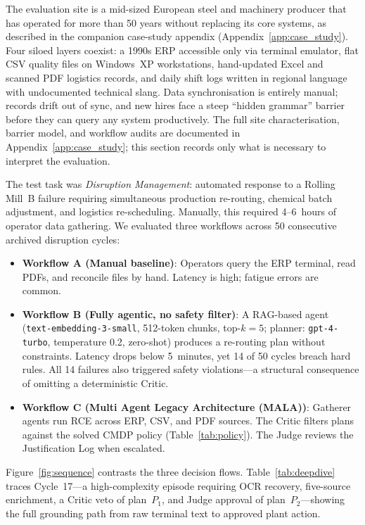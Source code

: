 \documentclass[conference]{IEEEtran}
\newcommand{\MALA}{Multi Agent Legacy Architecture (MALA)}
\begin{document}
The evaluation site is a mid-sized European steel and machinery producer that has operated for more than 50 years without replacing its core systems, as described in the companion case-study appendix (Appendix~\ref{app:case_study}). Four siloed layers coexist: a 1990s ERP accessible only via terminal emulator, flat CSV quality files on Windows~XP workstations, hand-updated Excel and scanned PDF logistics records, and daily shift logs written in regional language with undocumented technical slang. Data synchronisation is entirely manual; records drift out of sync, and new hires face a steep ``hidden grammar'' barrier before they can query any system productively. The full site characterisation, barrier model, and workflow audits are documented in Appendix~\ref{app:case_study}; this section records only what is necessary to interpret the evaluation.

The test task was \emph{Disruption Management}: automated response to a Rolling Mill~B failure requiring simultaneous production re-routing, chemical batch adjustment, and logistics re-scheduling. Manually, this required 4--6~hours of operator data gathering. We evaluated three workflows across 50 consecutive archived disruption cycles:

\begin{itemize}
  \item \textbf{Workflow A (Manual baseline)}: Operators query the ERP terminal, read PDFs, and reconcile files by hand. Latency is high; fatigue errors are common.
  \item \textbf{Workflow B (Fully agentic, no safety filter)}: A RAG-based agent (\texttt{text-embedding-3-small}, 512-token chunks, top-$k{=}5$; planner: \texttt{gpt-4-turbo}, temperature 0.2, zero-shot) produces a re-routing plan without constraints. Latency drops below 5~minutes, yet 14 of 50 cycles breach hard rules. All 14 failures also triggered safety violations---a structural consequence of omitting a deterministic Critic.
  \item \textbf{Workflow C (\MALA{})}: Gatherer agents run RCE across ERP, CSV, and PDF sources. The Critic filters plans against the solved CMDP policy (Table~\ref{tab:policy}). The Judge reviews the Justification Log when escalated.
\end{itemize}

Figure~\ref{fig:sequence} contrasts the three decision flows. Table~\ref{tab:deepdive} traces Cycle~17---a high-complexity episode requiring OCR recovery, five-source enrichment, a Critic veto of plan~$P_1$, and Judge approval of plan~$P_2$---showing the full grounding path from raw terminal text to approved plant action.
\end{document}
